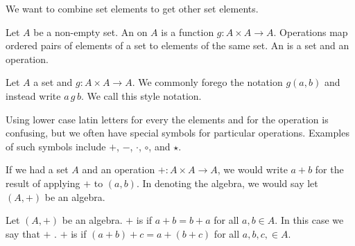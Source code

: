 
\sbasic





\sstart
{}


We want to combine set elements to get other set elements.



Let $A$ be a non-empty set.
An  on $A$ is a function $g: A \times A \to A$.
Operations map ordered pairs of elements of a set to elements of the same set.
An  is a set and an operation.



Let $A$ a set and $g: A \times A \to A$.
We commonly forego the notation $g(a, b)$ and instead write $a\,g\,b$.
We call this style  notation.

Using lower case latin letters for every the elements and for the operation is confusing, but we often have special symbols for particular operations.
Examples of such symbols include $+$, $-$, $\cdot$, $\circ$, and $\star$.

If we had a set $A$ and an operation $+: A \times A \to A$, we would write $a+b$ for the result of applying $+$ to $(a,b)$.
In denoting the algebra, we would say let $(A, +)$ be an algebra.


Let $(A, +)$ be an algebra.
$+$ is  if $a + b = b + a$ for all $a, b \in A$.
In this case we say that $+$ .
$+$ is  if $(a + b) + c = a + (b + c)$ for all $a, b, c, \in A$.


\strats
